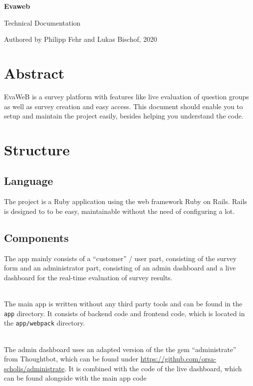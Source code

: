 \documentclass[11pt]{article}
\begin{document}
\begin{titlepage}
	\begin{center}
		\Large\textbf{Evaweb}
	\end{center}
	\begin{center}
		Technical Documentation
	\end{center}
	\begin{center}
		Authored by Philipp Fehr and Lukas Bischof, 2020
	\end{center}
\end{titlepage}
\printindex
{}
\section{Abstract}
EvaWeB is a survey platform with features like live evaluation of question groups
as well as survey creation and easy access.
This document should enable you to setup and maintain the project easily, besides helping you understand the code.


\pagebreak
{}
\section{Structure}
\subsection{Language}
\setlength{\parindent}{0ex}
The project is a Ruby application using the web framework Ruby on Rails.
Rails is designed to to be easy, maintainable without the need of configuring a lot.
\subsection{Components}
The app mainly consists of a ``customer'' / user part, consisting of the survey form
and an administrator part, consisting of an admin dashboard and a live dashboard for the real-time evaluation of survey results.

\par ~\\
The main app is written without any third party tools and can be found in the \verb|app| directory.
It consists of backend code and frontend code, which is located in the \verb|app/webpack| directory.

\par ~\\
The admin dashboard uses an adapted version of the the gem ``administrate'' from Thoughtbot,
which can be found under \url{https://github.com/orsa-scholis/administrate}.
It is combined with the code of the live dashboard, which can be found alongside with the main app code
\end{document}
